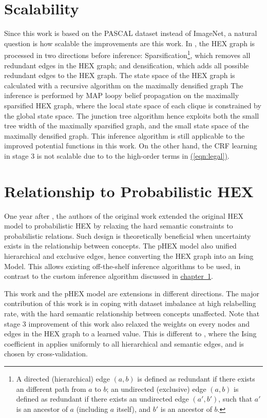 \documentclass[11pt,a4paper]{book}
\begin{document}
\section{Scalability}
\label{sec:scale}

Since this work is based on the PASCAL dataset instead of ImageNet, a natural question is how scalable the improvements are this work. In \cite{deng2014large}, the HEX graph is processed in two directions before inference: Sparsification\footnote{A directed (hierarchical) edge $(a,b)$ is defined as redundant if there exists an different path from $a$ to $b$; an undirected (exclusive) edge $(a,b)$ is defined as redundant if there exists an undirected edge $(a',b')$, such that $a'$ is an ancestor of $a$ (including $a$ itself), and $b'$ is an ancestor of $b$.}, which removes all redundant edges in the HEX graph; and densification, which adds all possible redundant edges to the HEX graph. The state space of the HEX graph is calculated with a recursive algorithm on the maximally densified graph The inference is performed by MAP loopy belief propagation on the maximally sparsified HEX graph, where the local state space of each clique is constrained by the global state space. The junction tree algorithm hence exploits both the small tree width of the maximally sparsified graph, and the small state space of the maximally densified graph. This inference algorithm is still applicable to the improved potential functions in this work. On the other hand, the CRF learning in stage 3 is not scalable due to to the high-order terms in \hyperref[eqn:legal]{(\ref{eqn:legal})}.

\section{Relationship to Probabilistic HEX}

One year after \cite{deng2014large}, the authors of the original work extended the original HEX model to probabilistic HEX \cite{ding2015probabilistic} by relaxing the hard semantic constraints to probabilistic relations. Such design is theoretically beneficial when uncertainty exists in the relationship between concepts. The pHEX model also unified hierarchical and exclusive edges, hence converting the HEX graph into an Ising Model. This allows existing off-the-shelf inference algorithms to be used, in contrast to the custom inference algorithm discussed in \hyperref[sec:scale]{chapter~\ref{sec:scale}}.

This work and the pHEX model are extensions in different directions. The major contribution of this work is in coping with dataset imbalance at high relabelling rate, with the hard semantic relationship between concepts unaffected. Note that stage 3 improvement of this work also relaxed the weights on every nodes and edges in the HEX graph to a learned value. This is different to \cite{ding2015probabilistic}, where the Ising coefficient in applies uniformly to all hierarchical and semantic edges, and is chosen by cross-validation.
\end{document}
